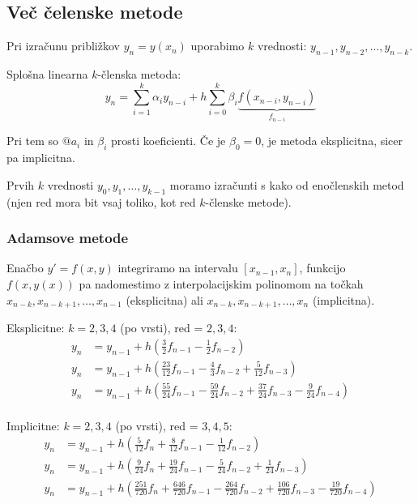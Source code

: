 \begin{multicols}{5}
\subsection*{Več čelenske metode}
Pri izračunu približkov $y_n = y(x_n)$ uporabimo $k$ vrednosti: $y_{n-1}, y_{n-2}, \dots, y_{n-k}$.

Splošna linearna $k$-členska metoda:
\[ y_n = \sum_{i=1}^k \alpha_i y_{n-i} + h \sum_{i=0}^k \beta_i \underbrace{f(x_{n-i}, y_{n-i})}_{f_{n-i}} \]

Pri tem so $@a_i$ in $\beta_i$ prosti koeficienti. Če je $\beta_0 = 0$, je metoda eksplicitna, sicer pa implicitna.

Prvih $k$ vrednosti $y_0, y_1, \dots, y_{k-1}$ moramo izračunti s kako od enočlenskih metod (njen red mora bit vsaj toliko, kot red $k$-členske metode).

\subsubsection*{Adamsove metode}
Enačbo $y' = f(x,y)$ integriramo na intervalu $[x_{n-1}, x_n]$, funkcijo $f(x, y(x))$ pa nadomestimo z interpolacijskim
polinomom na točkah $x_{n-k}, x_{n-k+1}, \dots, x_{n-1}$ (eksplicitna) ali  $x_{n-k}, x_{n-k+1}, \dots, x_{n}$ (implicitna).

Eksplicitne: $k = 2, 3, 4$ (po vrsti), red = $2, 3, 4$:
\begin{align*}
    y_n &= y_{n-1} + h\left( \frac{3}{2} f_{n-1} - \frac{1}{2} f_{n-2}\right) \\
    y_n &= y_{n-1} + h\left( \frac{23}{12} f_{n-1} - \frac{4}{3} f_{n-2} + \frac{5}{12}f_{n-3}\right) \\
    y_n &= y_{n-1} + h\left( \frac{55}{24} f_{n-1} - \frac{59}{24} f_{n-2} + \frac{37}{24}f_{n-3} - \frac{9}{24} f_{n-4}\right) \\
\end{align*}

Implicitne: $k = 2, 3, 4$ (po vrsti), red = $3, 4, 5$:
\begin{align*}
    y_n &= y_{n-1} + h\left( \frac{5}{12} f_{n} + \frac{8}{12} f_{n-1} - \frac{1}{12} f_{n-2}\right) \\
    y_n &= y_{n-1} + h\left( \frac{9}{24} f_{n} + \frac{19}{24} f_{n-1} - \frac{5}{24} f_{n-2} + \frac{1}{24}f_{n-3}\right) \\
    y_n &= y_{n-1} + {\scriptstyle h\left( \frac{251}{720} f_{n} + \frac{646}{720} f_{n-1} - \frac{264}{720} f_{n-2} + \frac{106}{720}f_{n-3} - \frac{19}{720} f_{n-4}\right) }
\end{align*}


\end{multicols}
